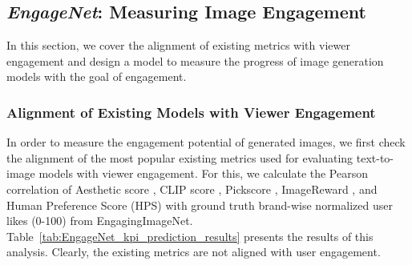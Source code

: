  \subsection{\textit{EngageNet}: Measuring Image Engagement}
 \label{sec:Measuring Engagement: EngageNet and Engagement Arena}

In this section, we cover the alignment of existing metrics with viewer engagement and design a model to measure the progress of image generation models with the goal of engagement.
 \subsubsection{Alignment of Existing Models with Viewer Engagement}
  In order to measure the engagement potential of generated images, we first check the alignment of the most popular existing metrics used for evaluating text-to-image models with viewer engagement. For this, we calculate the Pearson correlation of Aesthetic score \cite{schuhmann2022laion}, CLIP score \cite{radford2021learning}, Pickscore \cite{kirstain2023pick}, ImageReward \cite{xu2024imagereward}, and Human Preference Score (HPS) \cite{Wu_2023_ICCV} with ground truth brand-wise normalized user likes (0-100) from EngagingImageNet. Table~\ref{tab:EngageNet_kpi_prediction_results} presents the results of this analysis. Clearly, the existing metrics are not aligned with user engagement. 
 

